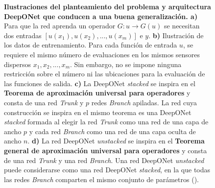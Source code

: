 \documentclass[
  spanish,
  us-letterpaper,
  DIV=11,
  numbers=noendperiod]{scrreprt}
\theoremstyle{definition}
\theoremstyle{plain}
\theoremstyle{remark}
\begin{document}
\begin{figure}


\caption{\label{fig-deeponet-arch}\textbf{Ilustraciones del
planteamiento del problema y arquitectura DeepONet que conducen a una
buena generalización. a)} Para que la red aprenda un operador
\(G : u \rightarrow G(u)\) se necesitan dos entradas
\([u(x_1), u(x_2), ..., u(x_m)]\) e \(y\). \textbf{b)} Ilustración de
los datos de entrenamiento. Para cada función de entrada \(u\), se
requiere el mismo número de evaluaciones en los mismos sensores
dispersos \(x_1, x_2, ..., x_m\). Sin embargo, no se impone ninguna
restricción sobre el número ni las ubicaciones para la evaluación de las
funciones de salida. \textbf{c)} La DeepONet \emph{stacked} se inspira
en el \textbf{Teorema de aproximación universal para operadores} y
consta de una red \emph{Trunk} y \(p\) redes \emph{Branch} apiladas. La
red cuya construcción se inspira en el mismo teorema es una DeepONet
\emph{stacked} formada al elegir la red \emph{Trunk} como una red de una
capa de ancho \(p\) y cada red \emph{Branch} como una red de una capa
oculta de ancho \(n\). \textbf{d)} La red DeepONet \emph{unstacked} se
inspira en el \textbf{Teorema general de aproximación universal para
operadores} y consta de una red \emph{Trunk} y una red \emph{Branch}.
Una red DeepONet \emph{unstacked} puede considerarse como una red
DeepONet \emph{stacked}, en la que todas las redes \emph{Branch}
comparten el mismo conjunto de parámetros
().}

\end{figure}%
\end{document}
